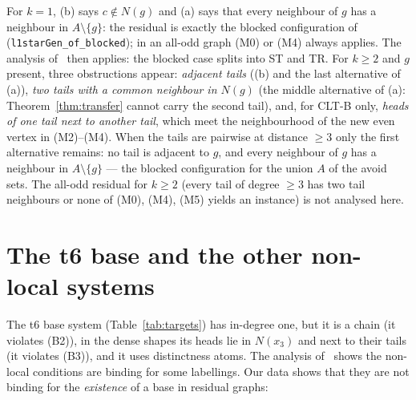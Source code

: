 \documentclass[11pt]{amsart}
\theoremstyle{definition}
\begin{document}
For $k=1$, (b) says $c\notin N(g)$ and (a) says that every neighbour of $g$ has a neighbour in
$A\setminus\{g\}$: the residual is exactly the blocked configuration of~\cite{L1S}
(\texttt{l1starGen\_of\_blocked}); in an all-odd graph (M0) or (M4) always applies. The analysis
of~\cite{L1I} then applies: the blocked case splits into ST and TR. For $k\ge2$ and $g$ present, three
obstructions appear: \emph{adjacent tails} ((b) and the last alternative of (a)), \emph{two tails
with a common neighbour in $N(g)$} (the middle alternative of (a): Theorem~\ref{thm:transfer} cannot
carry the second tail), and, for CLT-B only, \emph{heads of one tail next to another tail}, which
meet the neighbourhood of the new even vertex in (M2)--(M4). When the tails are pairwise at
distance $\ge3$ only the first alternative remains: no tail is adjacent to $g$, and every neighbour
of $g$ has a neighbour in $A\setminus\{g\}$ --- the blocked configuration for the union $A$ of the
avoid sets. The all-odd residual for $k\ge2$ (every tail of degree $\ge3$ has two tail neighbours or
none of (M0), (M4), (M5) yields an instance) is not analysed here.

\section{The t6 base and the other non-local systems}\label{sec:t6}

The t6 base system (Table~\ref{tab:targets}) has in-degree one, but it is a chain (it violates
(B2)), in the dense shapes its heads lie in $N(x_3)$ and next to their tails (it violates (B3)), and
it uses distinctness atoms. The analysis
of~\cite[AD.4]{T6} shows the non-local conditions are binding for some labellings. Our data shows
that they are not binding for the \emph{existence} of a base in residual graphs:
\end{document}
